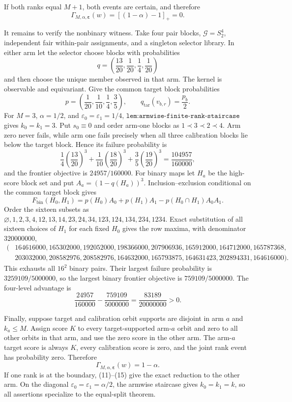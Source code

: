 If both ranks equal \(M+1\), both events are certain, and therefore
\[
\Gamma_{M,\alpha,\boldsymbol\varepsilon}(w)=[(1-\alpha)-1]_+=0. \tag{16}
\]

It remains to verify the nonbinary witness. Take four pair blocks, \(\mathcal G=S_2^4\), independent fair within-pair assignments, and a singleton selector library. In either arm let the selector choose blocks with probabilities
\[
q=\left(\frac{13}{20},\frac1{20},\frac14,\frac1{20}\right) \tag{17}
\]
and then choose the unique member observed in that arm. The kernel is observable and equivariant. Give the common target block probabilities
\[
p=\left(\frac1{20},\frac1{10},\frac14,\frac35\right),\qquad q_{\mathrm{tar}}(v_{b,r})=\frac{p_b}{2}. \tag{18}
\]
For \(M=3\), \(\alpha=1/2\), and \(\varepsilon_0=\varepsilon_1=1/4\), \(\texttt{lem:armwise-finite-rank-staircase}\) gives \(k_0=k_1=3\). Put \(s_0\equiv0\) and order arm-one blocks as \(1\prec3\prec2\prec4\). Arm zero never fails, while arm one fails precisely when all three calibration blocks lie below the target block. Hence its failure probability is
\[
\frac14\left(\frac{13}{20}\right)^3+\frac1{10}\left(\frac{18}{20}\right)^3+\frac35\left(\frac{19}{20}\right)^3=\frac{104957}{160000}, \tag{19}
\]
and the frontier objective is \(24957/160000\). For binary maps let \(H_a\) be the high-score block set and put \(A_a=(1-q(H_a))^3\). Inclusion--exclusion conditional on the common target block gives
\[
F_{\mathrm{bin}}(H_0,H_1)=p(H_0)A_0+p(H_1)A_1-p(H_0\cap H_1)A_0A_1. \tag{20}
\]
Order the sixteen subsets as \(\varnothing,1,2,3,4,12,13,14,23,24,34,123,124,134,234,1234\). Exact substitution of all sixteen choices of \(H_1\) for each fixed \(H_0\) gives the row maxima, with denominator \(320000000\),
\[
\begin{split}
(&164616000,165302000,192052000,198366000,207906936,165912000,164712000,165787368,\\
&203032000,208582976,208582976,164632000,165793875,164631423,202894331,164616000).
\end{split} \tag{21}
\]
This exhausts all \(16^2\) binary pairs. Their largest failure probability is \(3259109/5000000\), so the largest binary frontier objective is \(759109/5000000\). The four-level advantage is
\[
\frac{24957}{160000}-\frac{759109}{5000000}=\frac{83189}{20000000}>0. \tag{22}
\]

Finally, suppose target and calibration orbit supports are disjoint in arm \(a\) and \(k_a\le M\). Assign score \(K\) to every target-supported arm-\(a\) orbit and zero to all other orbits in that arm, and use the zero score in the other arm. The arm-\(a\) target score is always \(K\), every calibration score is zero, and the joint rank event has probability zero. Therefore
\[
\Gamma_{M,\alpha,\boldsymbol\varepsilon}(w)=1-\alpha. \tag{23}
\]
If one rank is at the boundary, (11)--(15) give the exact reduction to the other arm. On the diagonal \(\varepsilon_0=\varepsilon_1=\alpha/2\), the armwise staircase gives \(k_0=k_1=k\), so all assertions specialize to the equal-split theorem.